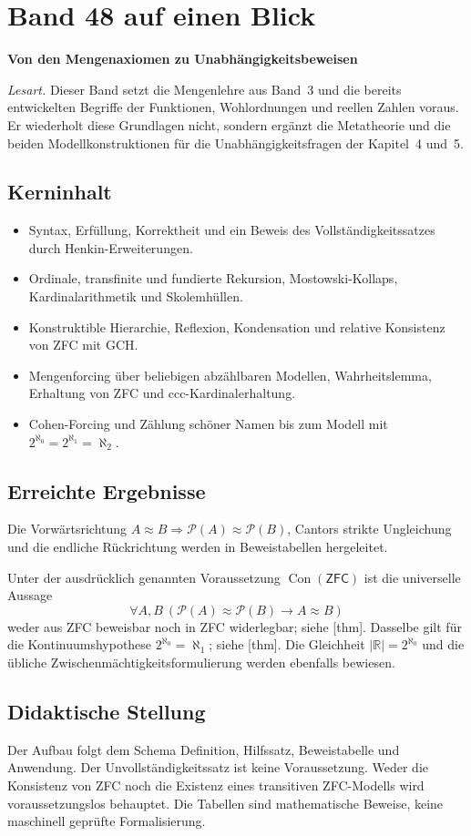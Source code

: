 \chapter[Band 48: Axiomatische Mengenlehre II]{Band 48 auf einen Blick}
\noindent\textbf{Von den Mengenaxiomen zu Unabhängigkeitsbeweisen}\par\medskip
\noindent\emph{Lesart.}
Dieser Band setzt die Mengenlehre aus Band~3 und die bereits
entwickelten Begriffe der Funktionen, Wohlordnungen und reellen
Zahlen voraus. Er wiederholt diese Grundlagen nicht, sondern
ergänzt die Metatheorie und die beiden Modellkonstruktionen für
die Unabhängigkeitsfragen der Kapitel~4 und~5.

\section*{Kerninhalt}
\begin{itemize}
 \item Syntax, Erfüllung, Korrektheit und ein Beweis des
       Vollständigkeitssatzes durch Henkin-Erweiterungen.
 \item Ordinale, transfinite und fundierte Rekursion,
       Mostowski-Kollaps, Kardinalarithmetik und Skolemhüllen.
 \item Konstruktible Hierarchie, Reflexion, Kondensation und
       relative Konsistenz von ZFC mit GCH.
 \item Mengenforcing über beliebigen abzählbaren Modellen,
       Wahrheitslemma, Erhaltung von ZFC und ccc-Kardinalerhaltung.
 \item Cohen-Forcing und Zählung schöner Namen bis zum Modell
       mit \(2^{\aleph_0}=2^{\aleph_1}=\aleph_2\).
\end{itemize}

\section*{Erreichte Ergebnisse}
Die Vorwärtsrichtung
\(A\approx B\Rightarrow\mathcal P(A)\approx\mathcal P(B)\),
Cantors strikte Ungleichung und die endliche Rückrichtung
werden in Beweistabellen hergeleitet.

Unter der ausdrücklich genannten Voraussetzung
\(\operatorname{Con}(\mathsf{ZFC})\) ist die universelle Aussage
\[
 \forall A,B\
 (\mathcal P(A)\approx\mathcal P(B)\to A\approx B)
\]
weder aus ZFC beweisbar noch in ZFC widerlegbar; siehe
[thm].
Dasselbe gilt für die Kontinuumshypothese
\(2^{\aleph_0}=\aleph_1\); siehe
[thm].
Die Gleichheit \(|\mathbb R|=2^{\aleph_0}\) und die
übliche Zwischenmächtigkeitsformulierung werden ebenfalls bewiesen.

\section*{Didaktische Stellung}
Der Aufbau folgt dem Schema Definition, Hilfssatz,
Beweistabelle und Anwendung. Der Unvollständigkeitssatz ist
keine Voraussetzung. Weder die Konsistenz von ZFC noch
die Existenz eines transitiven ZFC-Modells wird
voraussetzungslos behauptet. Die Tabellen sind mathematische
Beweise, keine maschinell geprüfte Formalisierung.

